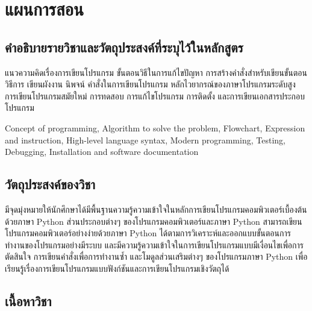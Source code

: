 \chapter{แผนการสอน}
\section*{คำอธิบายรายวิชาและวัตถุประสงค์ที่ระบุไว้ในหลักสูตร}


\begin{tcolorbox}[breakable,enhanced,fonttitle=\bfseries,colback=myblue!05,colframe=myblue]
แนวความคิดเรื่องการเขียนโปรแกรม ขั้นตอนวิธีในการแก้ไขปัญหา การสร้างคำสั่งสำหรับเขียนขั้นตอนวิธีการ เขียนผังงาน นิพจน์ คำสั่งในการเขียนโปรแกรม หลักไวยากรณ์ของภาษาโปรแกรมระดับสูง การเขียนโปรแกรมสมัยใหม่ การทดสอบ การแก้ไขโปรแกรม การติดตั้ง และการเขียนเอกสารประกอบโปรแกรม

Concept of programming, Algorithm to solve the problem, Flowchart, Expression and instruction, High-level language syntax, Modern programming, Testing, Debugging, Installation and software documentation
\end{tcolorbox}

\section*{วัตถุประสงค์ของวิชา}

\begin{tcolorbox}[breakable,enhanced,fonttitle=\bfseries,colback=myblue!05,colframe=myblue]
มีจุดมุ่งหมายให้นักศึกษาได้มีพื้นฐานความรู้ความเข้าใจในหลักการเขียนโปรแกรมคอมพิวเตอร์เบื้องต้นด้วยภาษา Python ส่วนประกอบต่างๆ ของโปรแกรมคอมพิวเตอร์และภาษา Python สามารถเขียนโปรแกรมคอมพิวเตอร์อย่างง่ายด้วยภาษา Python ได้ตามการวิเคราะห์และออกแบบขั้นตอนการทำงานของโปรแกรมอย่างมีระบบ และมีความรู้ความเข้าใจในการเขียนโปรแกรมแบบมีเงื่อนไขเพื่อการตัดสินใจ การเขียนคำสั่งเพื่อการทำงานซ้ำ และโมดูลส่วนเสริมต่างๆ ของโปรแกรมภาษา Python เพื่อเรียนรู้เรื่องการเขียนโปรแกรมแบบฟังก์ชันและการเขียนโปรแกรมเชิงวัตถุได้
\end{tcolorbox}
\vspace{1.5cm}

\section*{เนื้อหาวิชา}




